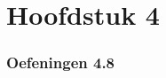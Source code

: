 \documentclass[lineaire_algebra_oplossingen.tex]{subfiles}
\begin{document}
\part{Hoofdstuk 4}
\section{Oefeningen 4.8}
\end{document}
